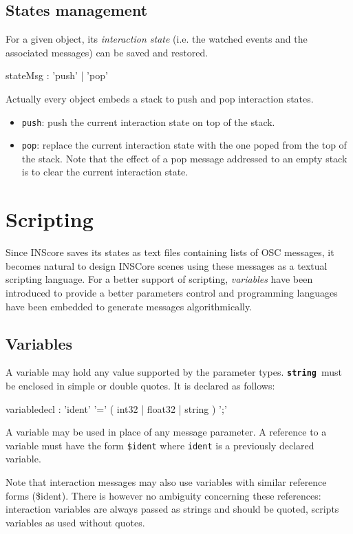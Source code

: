 \documentclass[a4paper,twoside]{report}
\newcommand{\toplevel}[1]	{\chapter{#1}}
\newcommand{\sublevel}[1]	{\section{#1}}
\newcommand{\OSC}[1]		{\texttt{#1}}
\newcommand{\osctype}[1]{\textbf{\texttt{{\small #1}}}}
\newcommand{\oscstring}{\osctype{string}}
\begin{document}
\sublevel{States management}
\label{evtstats}

For a given object, its \emph{interaction state} (i.e. the watched events and the associated messages) can be saved and restored.
\begin{rail} 
stateMsg : 'push' | 'pop'
\end{rail}

Actually every object embeds a stack to push and pop interaction states. 
\begin{itemize}
\item \OSC{push}: push the current interaction state on top of the stack.
\item \OSC{pop}: replace the current interaction state with the one poped from the top of the stack.
Note that the effect of a pop message addressed to an empty stack is to clear the current interaction state.
\end{itemize}




\toplevel{Scripting}\label{scripting}

Since INScore saves its states as text files containing lists of OSC messages, it becomes natural to design INSCore scenes using these messages as a textual scripting language. For a better support of scripting, \emph{variables} have been introduced to provide a better parameters control and programming languages have been embedded to generate messages algorithmically.

\sublevel{Variables}\label{scriptvar}

A variable may hold any value supported by the parameter types. \oscstring\ must be enclosed in simple or double quotes. It is declared as follows:
\begin{rail} 
variabledecl : 'ident' '=' ( int32 | float32 | string ) ';'
\end{rail}
A variable may be used in place of any message parameter. A reference to a variable must have the form \OSC{\$ident} where \OSC{ident} is a previously declared variable. 

Note that interaction messages may also use variables with similar reference forms (\$ident). There is however no ambiguity concerning these references: interaction variables are always passed as strings and should be quoted, scripts variables as used without quotes.
\end{document}
